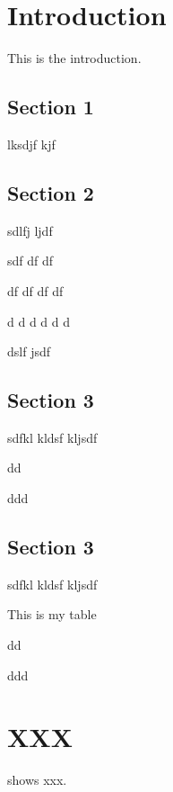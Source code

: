 \chapter{Introduction}

This is the introduction.

\section{Section 1}

lksdjf
kjf

\section{Section 2}

sdlfj
ljdf

sdf
df
df


df
df
df
df

d
d
d
d
d
d

\newpage

dslf
jsdf

\section{Section 3}

sdfkl
kldsf
kljsdf

dd

ddd

\section{Section 3}

sdfkl
kldsf
kljsdf

\begin{table}[htbp]
  \caption{This is my table}
  \label{tab:mytable}
  \centering
\end{table}

dd

ddd

\chapter{XXX}

 shows xxx.

